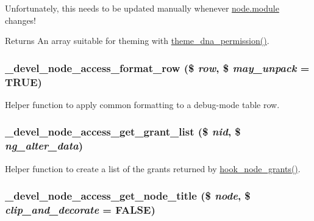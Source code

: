 Unfortunately, this needs to be updated manually whenever \hyperlink{node_8module}{node.module} changes!

\begin{DoxyReturn}{Returns}
An array suitable for theming with \hyperlink{devel__node__access_8module_a9a1d86356d3e21f44fd2bc73a915b329}{theme\_\-dna\_\-permission()}. 
\end{DoxyReturn}
\hypertarget{devel__node__access_8module_acd34231a07364b267c722f6335eb4a3f}{
\subsubsection[{\_\-devel\_\-node\_\-access\_\-format\_\-row}]{\setlength{\rightskip}{0pt plus 5cm}\_\-devel\_\-node\_\-access\_\-format\_\-row (\$ {\em row}, \/  \$ {\em may\_\-unpack} = {\ttfamily TRUE})}}
\label{devel__node__access_8module_acd34231a07364b267c722f6335eb4a3f}
Helper function to apply common formatting to a debug-\/mode table row. \hypertarget{devel__node__access_8module_a58e0c4afd1e983169bad627bcdfc9b89}{
\subsubsection[{\_\-devel\_\-node\_\-access\_\-get\_\-grant\_\-list}]{\setlength{\rightskip}{0pt plus 5cm}\_\-devel\_\-node\_\-access\_\-get\_\-grant\_\-list (\$ {\em nid}, \/  \$ {\em ng\_\-alter\_\-data})}}
\label{devel__node__access_8module_a58e0c4afd1e983169bad627bcdfc9b89}
Helper function to create a list of the grants returned by \hyperlink{group__node__access_gaa973f2ab6ab14c3fa14e5138c6d69ecf}{hook\_\-node\_\-grants()}. \hypertarget{devel__node__access_8module_aae8673d182a87acb3b8039decbe5fb4f}{
\subsubsection[{\_\-devel\_\-node\_\-access\_\-get\_\-node\_\-title}]{\setlength{\rightskip}{0pt plus 5cm}\_\-devel\_\-node\_\-access\_\-get\_\-node\_\-title (\$ {\em node}, \/  \$ {\em clip\_\-and\_\-decorate} = {\ttfamily FALSE})}}
